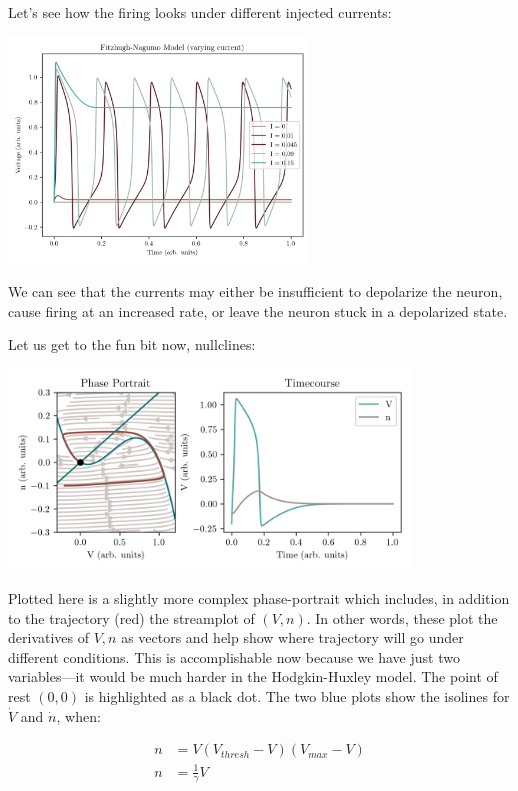 Let's see how the firing looks under different injected currents: 

\begin{center}
\includegraphics[width=0.6\textwidth]{images/models/fhn2.png}
\end{center}

We can see that the currents may either be insufficient to depolarize the neuron, cause firing at an increased rate, or leave the neuron stuck in a depolarized state. 

Let us get to the fun bit now, nullclines: 


\begin{center}
\includegraphics[width=0.8\textwidth]{images/models/fhnphase1.png}
\end{center}

Plotted here is a slightly more complex phase-portrait which includes, in addition to the trajectory (red) the streamplot of $(V, n)$. In other words, these plot the derivatives of $V,n$ as vectors and help show where trajectory will go under different conditions. This is accomplishable now because we have just two variables---it would be much harder in the Hodgkin-Huxley model. The point of rest $(0,0)$ is highlighted as a black dot. The two blue plots show the isolines for $\dot{V}$ and $\dot{n}$, when: 

\begin{equation}
\begin{split}
    n &= V (V_{thresh} - V)(V_{max} - V) \\
    n &= \frac{1}{\gamma} V \\
\end{split}
\end{equation}

